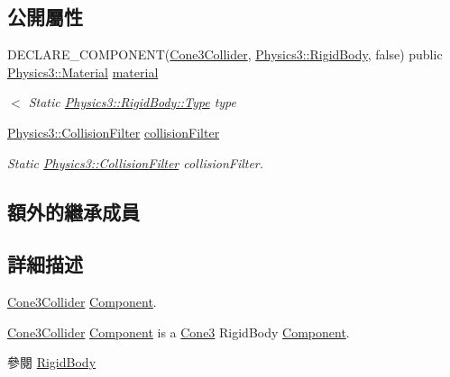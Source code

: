 \subsection*{公開屬性}
\begin{DoxyCompactItemize}
\item 
D\+E\+C\+L\+A\+R\+E\+\_\+\+C\+O\+M\+P\+O\+N\+E\+NT(\hyperlink{class_magnum_1_1_cone3_collider}{Cone3\+Collider}, \hyperlink{class_magnum_1_1_physics3_1_1_rigid_body}{Physics3\+::\+Rigid\+Body}, false) public \hyperlink{class_magnum_1_1_physics3_1_1_material}{Physics3\+::\+Material} \hyperlink{class_magnum_1_1_cone3_collider_aa4019240771cd0f0d0165abbe522a947}{material}
\begin{DoxyCompactList}\small\item\em $<$ Static \hyperlink{class_magnum_1_1_physics3_1_1_rigid_body_a429aa4fb7256b083334c86cdcd0d6b31}{Physics3\+::\+Rigid\+Body\+::\+Type} type \end{DoxyCompactList}\item 
\hyperlink{class_magnum_1_1_physics3_1_1_collision_filter}{Physics3\+::\+Collision\+Filter} \hyperlink{class_magnum_1_1_cone3_collider_aac5cbb2284a0bc6ac8857edf642110c7}{collision\+Filter}\hypertarget{class_magnum_1_1_cone3_collider_aac5cbb2284a0bc6ac8857edf642110c7}{}\label{class_magnum_1_1_cone3_collider_aac5cbb2284a0bc6ac8857edf642110c7}

\begin{DoxyCompactList}\small\item\em Static \hyperlink{class_magnum_1_1_physics3_1_1_collision_filter}{Physics3\+::\+Collision\+Filter} collision\+Filter. \end{DoxyCompactList}\end{DoxyCompactItemize}
\subsection*{額外的繼承成員}


\subsection{詳細描述}
\hyperlink{class_magnum_1_1_cone3_collider}{Cone3\+Collider} \hyperlink{class_magnum_1_1_component}{Component}. 

\hyperlink{class_magnum_1_1_cone3_collider}{Cone3\+Collider} \hyperlink{class_magnum_1_1_component}{Component} is a \hyperlink{class_magnum_1_1_cone3}{Cone3} Rigid\+Body \hyperlink{class_magnum_1_1_component}{Component}. \begin{DoxySeeAlso}{參閱}
\hyperlink{class_magnum_1_1_physics3_1_1_rigid_body_a2327744d90c049296ea0d63b3e64d335}{Rigid\+Body} 
\end{DoxySeeAlso}


